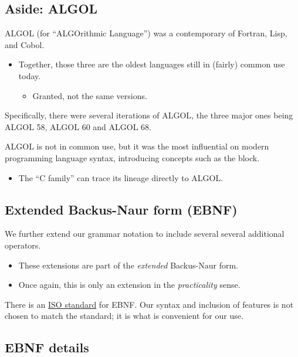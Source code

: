\documentclass[11pt]{article}
\theoremstyle{definition}
\begin{document}
\subsection{Aside: ALGOL}
\label{sec:org3023bc9}

ALGOL (for “ALGOrithmic Language”)
was a contemporary of Fortran, Lisp, and Cobol.
\begin{itemize}
\item Together, those three are the oldest languages
still in (fairly) common use today.
\begin{itemize}
\item Granted, not the same versions.
\end{itemize}
\end{itemize}

Specifically, there were several iterations of ALGOL,
the three major ones being ALGOL 58, ALGOL 60 and ALGOL 68.

ALGOL is not in common use, but it was
the most influential on modern programming language syntax,
introducing concepts such as the block.
\begin{itemize}
\item The “C family” can trace its lineage directly to ALGOL.
\end{itemize}

\subsection{Extended Backus-Naur form (EBNF)}
\label{sec:orgd102744}

We further extend our grammar notation to include several
several additional operators.
\begin{itemize}
\item These extensions are part of the \emph{extended} Backus-Naur form.
\item Once again, this is only an extension in the \emph{practicality} sense.
\end{itemize}

There is an \href{https://www.iso.org/standard/26153.html}{ISO standard} for EBNF.
Our syntax and inclusion of features is
not chosen to match the standard;
it is what is convenient for our use.

\subsection{EBNF details}
\label{sec:orgce87e45}
\end{document}
